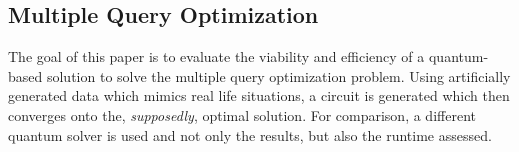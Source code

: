 \subsection{Multiple Query Optimization}
The goal of this paper is to evaluate the viability and efficiency of a quantum-based solution to solve the multiple query optimization problem. Using artificially generated data which mimics real life situations, a circuit is generated which then converges onto the, \emph{supposedly}, optimal solution. For comparison, a different quantum solver is used and not only the results, but also the runtime assessed.


\newpage
